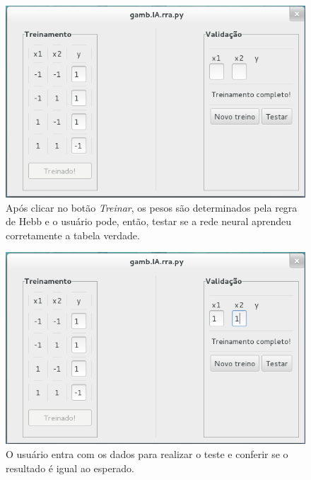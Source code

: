 \documentclass[11pt]{article}
\begin{document}
\begin{figure}[p]
\begin{center}
\includegraphics[scale=0.6]{figuras/gamb3}
\caption{Após clicar no botão \emph{Treinar}, os pesos são determinados pela regra de Hebb e o usuário pode, então, testar se a rede neural aprendeu corretamente a tabela verdade.}\label{fig:gamb3}
\end{center}
\end{figure}

\begin{figure}[p]
\begin{center}
\includegraphics[scale=0.6]{figuras/gamb4}
\caption{O usuário entra com os dados para realizar o teste e conferir se o resultado é igual ao esperado.}\label{fig:gamb4}
\end{center}
\end{figure}
\end{document}
